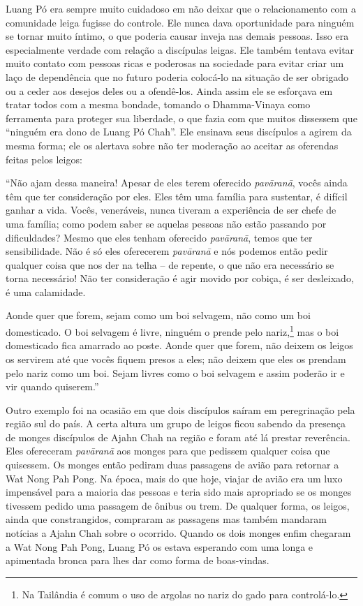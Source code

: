 Luang Pó era sempre muito cuidadoso em não deixar que o relacionamento
com a comunidade leiga fugisse do controle. Ele nunca dava oportunidade
para ninguém se tornar muito íntimo, o que poderia causar inveja nas
demais pessoas. Isso era especialmente verdade com relação a discípulas
leigas. Ele também tentava evitar muito contato com pessoas ricas e
poderosas na sociedade para evitar criar um laço de dependência que no
futuro poderia colocá-lo na situação de ser obrigado ou a ceder aos
desejos deles ou a ofendê-los. Ainda assim ele se esforçava em tratar
todos com a mesma bondade, tomando o Dhamma-Vinaya como ferramenta para
proteger sua liberdade, o que fazia com que muitos dissessem que
``ninguém era dono de Luang Pó Chah''. Ele ensinava seus discípulos a
agirem da mesma forma; ele os alertava sobre não ter moderação ao
aceitar as oferendas feitas pelos leigos:

``Não ajam dessa maneira! Apesar de eles terem oferecido
\emph{pavāranā}, vocês ainda têm que ter consideração por eles. Eles têm
uma família para sustentar, é difícil ganhar a vida. Vocês, veneráveis,
nunca tiveram a experiência de ser chefe de uma família; como podem
saber se aquelas pessoas não estão passando por dificuldades? Mesmo que
eles tenham oferecido \emph{pavāranā}, temos que ter sensibilidade. Não
é só eles oferecerem \emph{pavāranā} e nós podemos então pedir qualquer
coisa que nos der na telha -- de repente, o que não era necessário se
torna necessário! Não ter consideração é agir movido por cobiça, é ser
desleixado, é uma calamidade.

Aonde quer que forem, sejam como um boi selvagem, não como um boi
domesticado. O boi selvagem é livre, ninguém o prende pelo
nariz,\footnote{Na Tailândia é comum o uso de argolas no nariz do gado
  para controlá-lo.} mas o boi domesticado fica amarrado ao poste.
Aonde quer que forem, não deixem os leigos os servirem até que vocês
fiquem presos a eles; não deixem que eles os prendam pelo nariz como um
boi. Sejam livres como o boi selvagem e assim poderão ir e vir quando
quiserem.''

Outro exemplo foi na ocasião em que dois discípulos saíram em
peregrinação pela região sul do país. A certa altura um grupo de leigos
ficou sabendo da presença de monges discípulos de Ajahn Chah na região e
foram até lá prestar reverência. Eles ofereceram \emph{pavāranā} aos
monges para que pedissem qualquer coisa que quisessem. Os monges então
pediram duas passagens de avião para retornar a Wat Nong Pah Pong. Na
época, mais do que hoje, viajar de avião era um luxo impensável para a
maioria das pessoas e teria sido mais apropriado se os monges tivessem
pedido uma passagem de ônibus ou trem. De qualquer forma, os leigos,
ainda que constrangidos, compraram as passagens mas também mandaram
notícias a Ajahn Chah sobre o ocorrido. Quando os dois monges enfim
chegaram a Wat Nong Pah Pong, Luang Pó os estava esperando com uma longa
e apimentada bronca para lhes dar como forma de boas-vindas.

